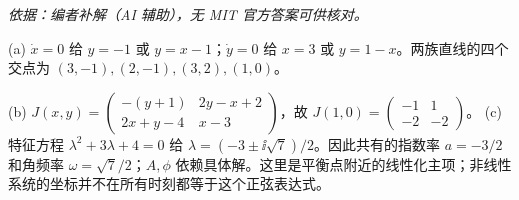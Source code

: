\begin{solution}
\textit{依据：编者补解（AI 辅助），无 MIT 官方答案可供核对。}\par
(a) $\dot x=0$ 给 $y=-1$ 或 $y=x-1$；$\dot y=0$ 给 $x=3$ 或 $y=1-x$。两族直线的四个交点为 $(3,-1),(2,-1),(3,2),(1,0)$。
\begin{center}\end{center}
(b) $J(x,y)=\begin{pmatrix}-(y+1)&2y-x+2\\2x+y-4&x-3\end{pmatrix}$，故 $J(1,0)=\begin{pmatrix}-1&1\\-2&-2\end{pmatrix}$。
(c) 特征方程 $\lambda^2+3\lambda+4=0$ 给 $\lambda=(-3\pm\ii\sqrt7)/2$。因此共有的指数率 $a=-3/2$ 和角频率 $\omega=\sqrt7/2$；$A,\phi$ 依赖具体解。这里是平衡点附近的线性化主项；非线性系统的坐标并不在所有时刻都等于这个正弦表达式。
\end{solution}

